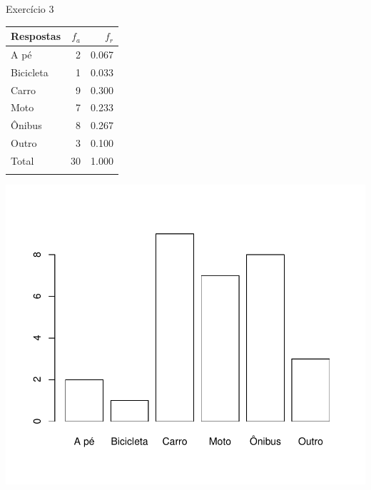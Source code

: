 \documentclass[
  ignorenonframetext,
  serif,
  professionalfont,
  usenames,
  dvipsnames,
  aspectratio = 169]{beamer}
\def\beginAHalfColumn{\begin{minipage}{0.49\textwidth}}%
\def\endColumns{\end{minipage}}%
\begin{document}
\begin{frame}{Exercício 3}
\label{exercuxedcio-3-2}
\beginAHalfColumn

\begin{longtable}[]{@{}lrr@{}}
\toprule\noalign{}
Respostas & \(f_a\) & \(f_r\) \\
\midrule\noalign{}
\endhead
A pé & 2 & 0.067 \\
Bicicleta & 1 & 0.033 \\
Carro & 9 & 0.300 \\
Moto & 7 & 0.233 \\
Ônibus & 8 & 0.267 \\
Outro & 3 & 0.100 \\
Total & 30 & 1.000 \\
\bottomrule\noalign{}
\end{longtable}

\endColumns
\beginAHalfColumn

\begin{center}\includegraphics[width=0.9\linewidth]{exercicios-encontro1-solucao_files/figure-beamer/unnamed-chunk-4-1} \end{center}

\endColumns
\end{frame}
\end{document}

